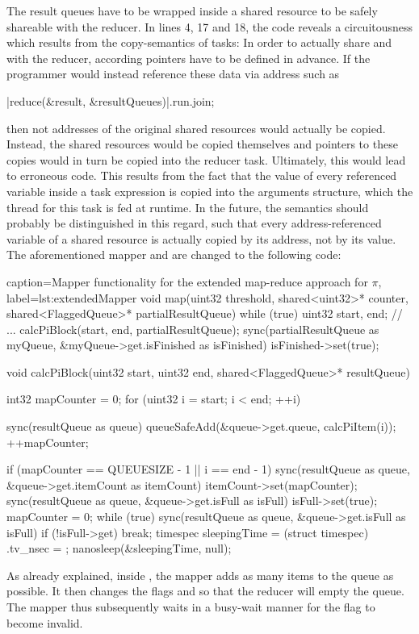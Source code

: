 The result queues have to be wrapped inside a shared resource to be safely shareable with the reducer. In lines 4, 17 and 18, the code reveals a circuitousness which results from the copy-semantics of tasks: In order to actually share  and  with the reducer, according pointers have to be defined in advance. If the programmer would instead reference these data via address such as
\begin{ccode}{}
|reduce(&result, &resultQueues)|.run.join; 
\end{ccode}
then not addresses of the original shared resources would actually be copied. Instead, the shared resources would be copied themselves and pointers to these copies would in turn be copied into the reducer task. Ultimately, this would lead to erroneous code. This results from the fact that the value of every referenced variable inside a task expression is copied into the arguments structure, which the thread for this task is fed at runtime. In the future, the semantics should probably be distinguished in this regard, such that every address-referenced variable of a shared resource is actually copied by its address, not by its value. The aforementioned mapper and  are changed to the following code:
\begin{ccode}{caption=Mapper functionality for the extended map-reduce approach for $\pi$, label=lst:extendedMapper}
void map(uint32 threshold, shared<uint32>* counter, shared<FlaggedQueue>* partialResultQueue) { 
  while (true) { 
    uint32 start, end; 
    // ...     
    calcPiBlock(start, end, partialResultQueue); 
  } 
  sync(partialResultQueue as myQueue, &myQueue->get.isFinished as isFinished) { isFinished->set(true); } 
}

void calcPiBlock(uint32 start, uint32 end, shared<FlaggedQueue>* resultQueue) { 
  int32 mapCounter = 0; 
  for (uint32 i = start; i < end; ++i) {
    sync(resultQueue as queue) { queueSafeAdd(&queue->get.queue, calcPiItem(i)); } 
    ++mapCounter; 
     
    if (mapCounter == QUEUESIZE - 1 || i == end - 1) { 
      sync(resultQueue as queue, &queue->get.itemCount as itemCount) { itemCount->set(mapCounter); } 
      sync(resultQueue as queue, &queue->get.isFull as isFull) { isFull->set(true); } 
      mapCounter = 0; 
      while (true) { 
        sync(resultQueue as queue, &queue->get.isFull as isFull) { if (!isFull->get) { break; } } 
        timespec sleepingTime = (struct timespec){ .tv_nsec = }; 
        nanosleep(&sleepingTime, null); 
      }
    }
  }
}
\end{ccode}
As already explained, inside , the mapper adds as many items to the queue as possible. It then changes the flags  and  so that the reducer will empty the queue. The mapper thus subsequently waits in a busy-wait manner for the  flag to become invalid.

